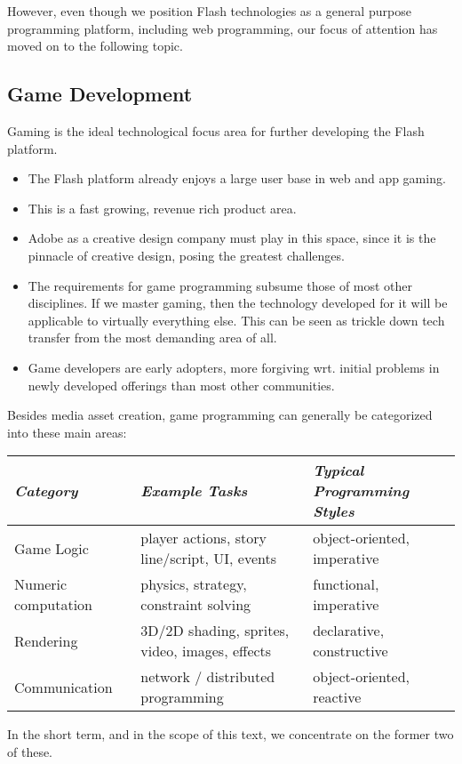 However, even though we position Flash technologies as a general purpose
programming platform, including web programming, our focus of attention has
moved on to the following topic.

\subsection{Game Development}

Gaming is the ideal technological focus area for further developing the Flash
platform.
\begin{itemize}
  \item The Flash platform already enjoys a large user base in web and app
  gaming.
  \item This is a fast growing, revenue rich product area.
  \item Adobe as a creative design company must play in this space, since it is
  the pinnacle of creative design, posing the greatest challenges.
  \item The requirements for game programming subsume those of most other disciplines.
        If we master gaming, then the technology developed for it will be
        applicable to virtually everything else.  This can be seen as
        trickle down tech transfer from the most demanding area of all.
  \item Game developers are early adopters, more forgiving wrt. initial problems
  in newly developed offerings than most other communities.
\end{itemize}

Besides media asset creation, game programming can generally be categorized into
these main areas:
\begin{center}
\begin{tabular}{ | l | l | l |}
\hline
{\em Category} & {\em Example Tasks} & {\em Typical Programming Styles} \\
\hline Game Logic & player actions, story line/script, UI, events &
object-oriented, imperative \\
\hline Numeric computation & physics, strategy, constraint
solving & functional, imperative \\
\hline Rendering & 3D/2D shading, sprites, video, images, effects & declarative,
constructive
\\
\hline Communication & network / distributed programming & object-oriented,
reactive
\\
\hline
\end{tabular}
\end{center}
In the short term, and in the scope of this text, we concentrate on the former
two of these.

